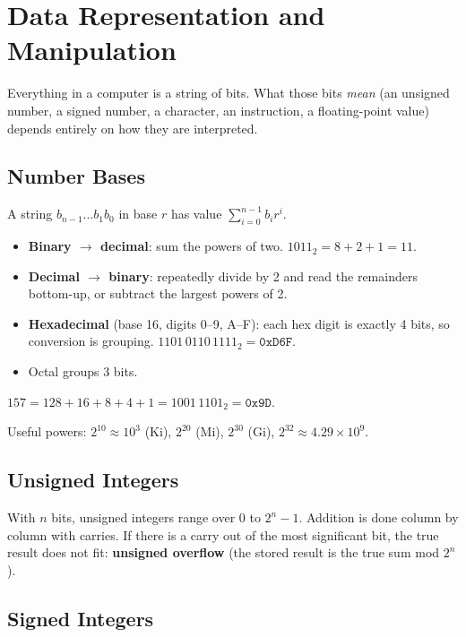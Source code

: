 \chapter{Data Representation and Manipulation}

Everything in a computer is a string of bits. What those bits \emph{mean}
(an unsigned number, a signed number, a character, an instruction, a
floating-point value) depends entirely on how they are interpreted.

\section{Number Bases}

A string $b_{n-1}\ldots b_1b_0$ in base $r$ has value
$\sum_{i=0}^{n-1} b_i r^i$.

\begin{itemize}
  \item \textbf{Binary $\to$ decimal}: sum the powers of two.
    $1011_2 = 8 + 2 + 1 = 11$.
  \item \textbf{Decimal $\to$ binary}: repeatedly divide by 2 and read the
    remainders bottom-up, or subtract the largest powers of 2.
  \item \textbf{Hexadecimal} (base 16, digits 0--9, A--F): each hex digit is
    exactly 4 bits, so conversion is grouping.
    $1101\,0110\,1111_2 = \texttt{0xD6F}$.
  \item Octal groups 3 bits.
\end{itemize}

\begin{example}
$157 = 128 + 16 + 8 + 4 + 1 = 1001\,1101_2 = \texttt{0x9D}$.
\end{example}

Useful powers: $2^{10} \approx 10^3$ (Ki), $2^{20}$ (Mi), $2^{30}$ (Gi),
$2^{32} \approx 4.29 \times 10^9$.

\section{Unsigned Integers}

With $n$ bits, unsigned integers range over $0$ to $2^n - 1$. Addition is
done column by column with carries. If there is a carry out of the most
significant bit, the true result does not fit: \textbf{unsigned overflow}
(the stored result is the true sum mod $2^n$).

\section{Signed Integers}

